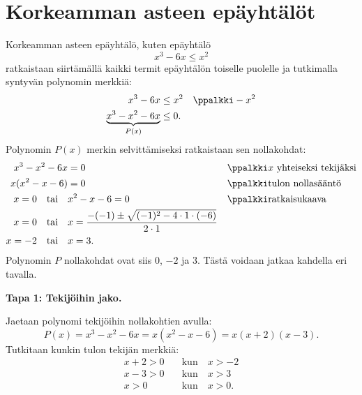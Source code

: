 \section{Korkeamman asteen epäyhtälöt}


Korkeamman asteen epäyhtälö, kuten epäyhtälö
\[
x^3 -6x \leq x^2
\]
ratkaistaan siirtämällä kaikki termit epäyhtälön toiselle puolelle ja tutkimalla syntyvän polynomin merkkiä:
\begin{align*}
x^3-6x & \leq x^2 & &\ppalkki -x^2 \\
\underbrace{x^3-x^2-6x}_{P(x)} &\leq 0. &&
\end{align*}
Polynomin $P(x)$ merkin selvittämiseksi ratkaistaan sen nollakohdat:
\begin{align*}
    x^3 - x^2-6x &= 0 & &\ppalkki \text{$x$ yhteiseksi tekijäksi} \\
    x(x^2 -x -6) &= 0 & &\ppalkki \text{tulon nollasääntö} \\
    x = 0 \quad \text{tai} \quad & x^2 -x -6 = 0 & &\ppalkki \text{ratkaisukaava} \\
    x= 0 \quad \text{tai} \quad & x=\frac{-(-1) \pm \sqrt{(-1)^2-4\cdot 1 \cdot (-6)}}{2\cdot 1} && \\
    x = -2 \quad \text{tai} \quad & x = 3. &&
\end{align*}
Polynomin $P$ nollakohdat ovat siis $0$, $-2$ ja $3$. Tästä voidaan jatkaa kahdella eri tavalla.

\textbf{Tapa 1: Tekijöihin jako.}

Jaetaan polynomi tekijöihin nollakohtien avulla:
\[
P(x) = x^3 - x^2-6x = x(x^2-x-6) = x(x+2)(x-3).
\]
Tutkitaan kunkin tulon tekijän merkkiä:
\begin{align*}
    x+2>0 & \quad \text{kun} \quad x > -2\\
    x-3>0 & \quad \text{kun} \quad x > 3\\
    x>0 & \quad \text{kun} \quad x > 0.
\end{align*}

